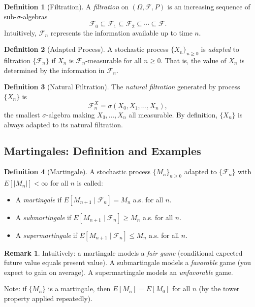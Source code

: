 \documentclass[12pt, a4paper]{article}
\theoremstyle{definition}
\newtheorem{definition}{Definition}[section]
\newtheorem{remark}{Remark}[section]
\theoremstyle{plain}
\begin{document}
\begin{definition}[Filtration]
A \emph{filtration} on $(\Omega, \mathcal{F}, P)$ is an increasing sequence of sub-$\sigma$-algebras
\[
  \mathcal{F}_0 \subseteq \mathcal{F}_1 \subseteq \mathcal{F}_2 \subseteq \cdots \subseteq \mathcal{F}.
\]
Intuitively, $\mathcal{F}_n$ represents the information available up to time $n$.
\end{definition}

\begin{definition}[Adapted Process]
A stochastic process $\{X_n\}_{n \geq 0}$ is \emph{adapted} to filtration $\{\mathcal{F}_n\}$ if $X_n$ is $\mathcal{F}_n$-measurable for all $n \geq 0$. That is, the value of $X_n$ is determined by the information in $\mathcal{F}_n$.
\end{definition}

\begin{definition}[Natural Filtration]
The \emph{natural filtration} generated by process $\{X_n\}$ is
\[
  \mathcal{F}_n^X = \sigma(X_0, X_1, \ldots, X_n),
\]
the smallest $\sigma$-algebra making $X_0, \ldots, X_n$ all measurable. By definition, $\{X_n\}$ is always adapted to its natural filtration.
\end{definition}

\subsection{Martingales: Definition and Examples}

\begin{definition}[Martingale]
A stochastic process $\{M_n\}_{n \geq 0}$ adapted to $\{\mathcal{F}_n\}$ with $E[|M_n|] < \infty$ for all $n$ is called:
\begin{itemize}
  \item A \emph{martingale} if $E[M_{n+1} \mid \mathcal{F}_n] = M_n$ a.s. for all $n$.
  \item A \emph{submartingale} if $E[M_{n+1} \mid \mathcal{F}_n] \geq M_n$ a.s. for all $n$.
  \item A \emph{supermartingale} if $E[M_{n+1} \mid \mathcal{F}_n] \leq M_n$ a.s. for all $n$.
\end{itemize}
\end{definition}

\begin{remark}
Intuitively: a martingale models a \emph{fair game} (conditional expected future value equals present value). A submartingale models a \emph{favorable} game (you expect to gain on average). A supermartingale models an \emph{unfavorable} game.

Note: if $\{M_n\}$ is a martingale, then $E[M_n] = E[M_0]$ for all $n$ (by the tower property applied repeatedly).
\end{remark}
\end{document}

